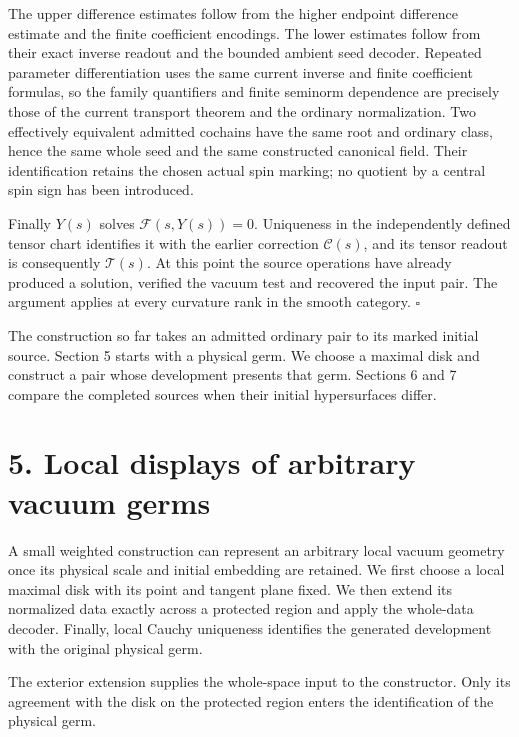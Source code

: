 \documentclass[
  english,
  11pt,
  reqno]{amsart}
\begin{document}
The upper difference estimates follow from the higher endpoint
difference estimate and the finite coefficient encodings. The lower
estimates follow from their exact inverse readout and the bounded
ambient seed decoder. Repeated parameter differentiation uses the same
current inverse and finite coefficient formulas, so the family
quantifiers and finite seminorm dependence are precisely those of the
current transport theorem and the ordinary normalization. Two
effectively equivalent admitted cochains have the same root and ordinary
class, hence the same whole seed and the same constructed canonical
field. Their identification retains the chosen actual spin marking; no
quotient by a central spin sign has been introduced.

Finally \(Y(s)\) solves \(\mathcal F(s,Y(s))=0\). Uniqueness in the
independently defined tensor chart identifies it with the earlier
correction \(\mathcal C(s)\), and its tensor readout is consequently
\(\mathcal T(s)\). At this point the source operations have already
produced a solution, verified the vacuum test and recovered the input
pair. The argument applies at every curvature rank in the smooth
category. \hfill\(\square\)

The construction so far takes an admitted ordinary pair to its marked
initial source. Section 5 starts with a physical germ. We choose a
maximal disk and construct a pair whose development presents that germ.
Sections 6 and 7 compare the completed sources when their initial
hypersurfaces differ.

\section{5. Local displays of arbitrary vacuum
germs}\label{local-displays-of-arbitrary-vacuum-germs}\label{sec:submission-local-coverage}

A small weighted construction can represent an arbitrary local vacuum
geometry once its physical scale and initial embedding are retained. We
first choose a local maximal disk with its point and tangent plane
fixed. We then extend its normalized data exactly across a protected
region and apply the whole-data decoder. Finally, local Cauchy
uniqueness identifies the generated development with the original
physical germ.

The exterior extension supplies the whole-space input to the
constructor. Only its agreement with the disk on the protected region
enters the identification of the physical germ.
\end{document}
